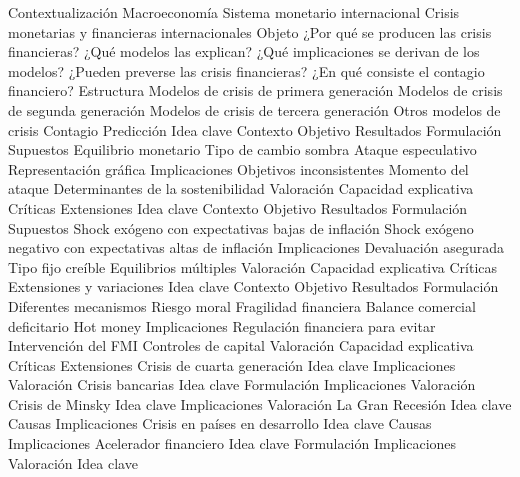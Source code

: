 \documentclass{nuevotema}
\begin{document}
\begin{esquema}[enumerate]
	\1[] 
		\2 Contextualización
			\3 Macroeconomía
			\3 Sistema monetario internacional
			\3 Crisis monetarias y financieras internacionales
		\2 Objeto
			\3 ¿Por qué se producen las crisis financieras?
			\3 ¿Qué modelos las explican?
			\3 ¿Qué implicaciones se derivan de los modelos?
			\3 ¿Pueden preverse las crisis financieras?
			\3 ¿En qué consiste el contagio financiero?
		\2 Estructura
			\3 Modelos de crisis de primera generación
			\3 Modelos de crisis de segunda generación
			\3 Modelos de crisis de tercera generación
			\3 Otros modelos de crisis
			\3 Contagio
			\3 Predicción
	\1 
		\2 Idea clave
			\3 Contexto
			\3 Objetivo
			\3 Resultados
		\2 Formulación
			\3 Supuestos
			\3 Equilibrio monetario
			\3 Tipo de cambio sombra
			\3 Ataque especulativo
			\3 Representación gráfica
		\2 Implicaciones
			\3 Objetivos inconsistentes
			\3 Momento del ataque
			\3 Determinantes de la sostenibilidad
		\2 Valoración
			\3 Capacidad explicativa
			\3 Críticas
			\3 Extensiones
	\1 
		\2 Idea clave
			\3 Contexto
			\3 Objetivo
			\3 Resultados
		\2 Formulación
			\3 Supuestos
			\3 Shock exógeno con expectativas bajas de inflación
			\3 Shock exógeno negativo con expectativas altas de inflación
		\2 Implicaciones
			\3 Devaluación asegurada
			\3 Tipo fijo creíble
			\3 Equilibrios múltiples
		\2 Valoración
			\3 Capacidad explicativa
			\3 Críticas
			\3 Extensiones y variaciones
	\1 
		\2 Idea clave
			\3 Contexto
			\3 Objetivo
			\3 Resultados
		\2 Formulación
			\3 Diferentes mecanismos
			\3 Riesgo moral
			\3 Fragilidad financiera
			\3 Balance comercial deficitario
			\3 Hot money
		\2 Implicaciones
			\3 Regulación financiera para evitar
			\3 Intervención del FMI
			\3 Controles de capital
		\2 Valoración
			\3 Capacidad explicativa
			\3 Críticas
			\3 Extensiones
	\1 
		\2 Crisis de cuarta generación
			\3 Idea clave
			\3 Implicaciones
			\3 Valoración
		\2 Crisis bancarias
			\3 Idea clave
			\3 Formulación
			\3 Implicaciones
			\3 Valoración
		\2 Crisis de Minsky
			\3 Idea clave
			\3 Implicaciones
			\3 Valoración
		\2 La Gran Recesión
			\3 Idea clave
			\3 Causas
			\3 Implicaciones
		\2 Crisis en países en desarrollo
			\3 Idea clave
			\3 Causas
			\3 Implicaciones
		\2 Acelerador financiero
			\3 Idea clave
			\3 Formulación
			\3 Implicaciones
			\3 Valoración
	\1 
		\2 Idea clave

\end{esquema}
\end{document}

